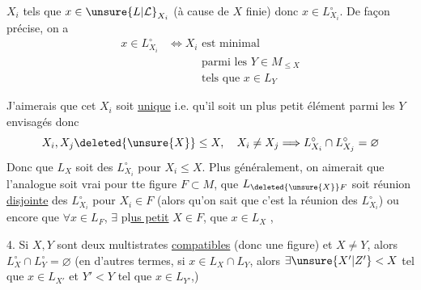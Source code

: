 $X_i$ tels que $x\in\unsure{L|\mathcal{L}}_{X_i}$ (à cause   de $X$ finie) donc $x\in L_{X_i}^{\circ}$. De façon précise, on a
\[
\begin{aligned}
 x\in L_{X_i}^{\circ}&\Longleftrightarrow X_i\text{ est minimal}\\
 &\hspace{3em}\text{parmi les }Y\in M_{\leq X}\\
 &\hspace{3em}\text{tels que }x\in L_Y
\end{aligned}
\]

J'aimerais que cet $X_i$ soit \uline{unique} i.e. qu'il soit un plus petit élément parmi les $Y$ envisagés donc
\[
 X_i,X_j\deleted{\unsure{X}}\leq X,\quad X_i\ne X_j\Longrightarrow L_{X_i}^{\circ}\cap L_{X_j}^{\circ}=\varnothing
\]
Donc que $L_X$ soit  \uline{} des $L_{X_i}^{\circ}$ pour $X_i\leq X$. Plus généralement, on aimerait que l'analogue soit vrai pour tte figure $F\subset M$,  que $L_{\deleted{\unsure{X}}F}$ soit réunion \uline{disjointe} des  $L_{X_i}^{\circ}$ pour $X_i\in F$ (alors qu'on sait  que c'est la réunion des $L_{X_i}^{\circ}$) ou encore que $\forall x\in L_F$, $\exists$ pl\uline{us petit} $X\in F$,  que $x\in L_X$ ,

\uline{} 4. Si $X,Y$ sont deux multistrates \uline{compatibles} (donc   une figure) et $X\ne Y$, alors $L_X^{\circ}\cap L_Y^{\circ}=\varnothing$ (en d'autres termes, si $x\in L_X\cap L_Y$, alors  $\exists\unsure{X'|Z'}<X$ tel que $x\in L_{X'}$ et  $Y'<Y$ tel que $x\in L_{Y'}$,) 


